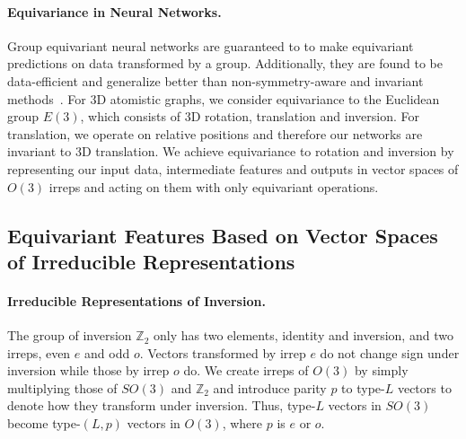 \paragraph{Equivariance in Neural Networks.}
Group equivariant neural networks are guaranteed to to make equivariant predictions on data transformed by a group.
Additionally, they are found to be data-efficient and generalize better than non-symmetry-aware and invariant methods~\citep{nequip, quantum_scaling, neural_scale_of_chemical_models}.
For 3D atomistic graphs, we consider equivariance to the Euclidean group $E(3)$, which consists of 3D rotation, translation and inversion.
For translation, we operate on relative positions and therefore our networks are invariant to 3D translation.
We achieve equivariance to rotation and inversion by representing our input data, intermediate features and outputs in vector spaces of $O(3)$ irreps and acting on them with only equivariant operations. 


\subsection{Equivariant Features Based on Vector Spaces of Irreducible Representations}
\label{appendix:subsec:equivariant_irreps_feature}


\paragraph{Irreducible Representations of Inversion.}
The group of inversion $\mathbb{Z}_2$ only has two elements, identity and inversion, and two irreps, even $e$ and odd $o$.
Vectors transformed by irrep $e$ do not change sign under inversion while those by irrep $o$ do.
We create irreps of $O(3)$ by simply multiplying those of $SO(3)$ and $\mathbb{Z}_2$ and introduce parity $p$ to type-$L$ vectors to denote how they transform under inversion.
Thus, type-$L$ vectors in $SO(3)$ become type-$(L, p)$ vectors in $O(3)$, where $p$ is $e$ or $o$.

